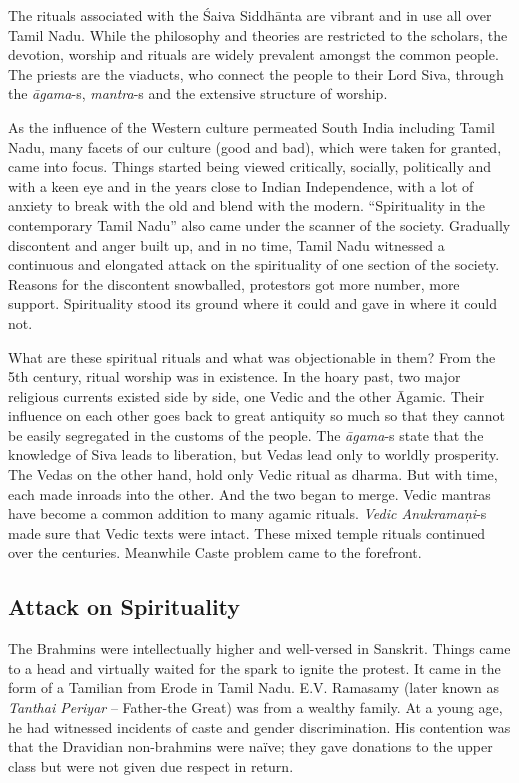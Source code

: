 The rituals associated with the Śaiva Siddhānta are vibrant and in use all over Tamil Nadu. While the philosophy and theories are restricted to the scholars, the devotion, worship and rituals are widely prevalent amongst the common people. The priests are the viaducts, who connect the people to their Lord Siva, through the \textit{āgama}-s, \textit{mantra}-s and the extensive structure of worship.

As the influence of the Western culture permeated South India including Tamil Nadu, many facets of our culture (good and bad), which were taken for granted, came into focus. Things started being viewed critically, socially, politically and with a keen eye and in the years close to Indian Independence, with a lot of anxiety to break with the old and blend with the modern. “Spirituality in the contemporary Tamil Nadu” also came under the scanner of the society. Gradually discontent and anger built up, and in no time, Tamil Nadu witnessed a continuous and elongated attack on the spirituality of one section of the society. Reasons for the discontent snowballed, protestors got more number, more support. Spirituality stood its ground where it could and gave in where it could not.

What are these spiritual rituals and what was objectionable in them? From the 5th century, ritual worship was in existence. In the hoary past, two major religious currents existed side by side, one Vedic and the other Āgamic. Their influence on each other goes back to great antiquity so much so that they cannot be easily segregated in the customs of the people. The \textit{āgama}-s state that the knowledge of Siva leads to liberation, but Vedas lead only to worldly prosperity. The Vedas on the other hand, hold only Vedic ritual as dharma. But with time, each made inroads into the other. And the two began to merge. Vedic mantras have become a common addition to many agamic rituals. \textit{Vedic Anukramaņi}-s made sure that Vedic texts were intact. These mixed temple rituals continued over the centuries. Meanwhile Caste problem came to the forefront.

\subsection*{Attack on Spirituality}

The Brahmins were intellectually higher and well-versed in Sanskrit. Things came to a head and virtually waited for the spark to ignite the protest. It came in the form of a Tamilian from Erode in Tamil Nadu. E.V. Ramasamy (later known as \textit{Tanthai Periyar} – Father-the Great) was from a wealthy family. At a young age, he had witnessed incidents of caste and gender discrimination. His contention was that the Dravidian non-brahmins were naïve; they gave donations to the upper class but were not given due respect in return. 


